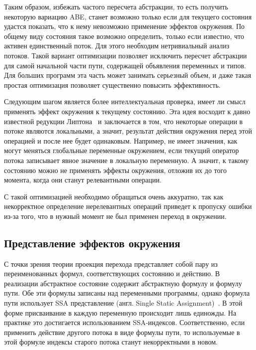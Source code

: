 Таким образом, избежать частого пересчета абстракции, то есть получить некоторую вариацию ABE, станет возможно только если для текущего состояния удастся показать, что к нему невозможно применение эффектов окружения.
По общему виду состояния такое возможно определить, только если известно, что активен единственный поток.
Для этого необходим нетривиальный анализ потоков.
Такой вариант оптимизации позволяет исключить пересчет абстракции для самой начальной части пути, содержащей объявления переменных и типов.
Для больших программ эта часть может занимать серьезный объем, и даже такая простая оптимизация позволяет существенно повысить эффективность.

Следующим шагом является более интеллектуальная проверка, имеет ли смысл применять эффект окружения к текущему состоянию.
Эта идея восходит к давно известной редукции Липтона~\cite{Lipton} и заключается в том, что некоторые операции в потоке являются локальными, а значит, результат действия окружения перед этой операцией и после нее будет одинаковым.
Например, не имеет значения, как могут меняться глобальные переменные окружением, если текущий оператор потока записывает явное значение в локальную переменную.
А значит, к такому состоянию можно не применять эффекты окружения, отложив их до того момента, когда они станут релевантными операции.

С такой оптимизацией необходимо обращаться очень аккуратно, так как некорректное определение нерелевантных операций приведет к пропуску ошибки из-за того, что в нужный момент не был применен переход в окружении.

\subsection{Представление эффектов окружения}
\label{sect_predicate_opt}
С точки зрения теории проекция перехода представляет собой пару из переименованных формул, соответствующих состоянию и действию. 
В реализации абстрактное состояние содержит абстрактную формулу и формулу пути.
Обе эти формулы записаны над переменными программы, однако формула пути использует SSA представление (англ. Single Static Assignment)~\cite{SSA}.
В этой форме присваивание в каждую переменную происходит лишь единожды.
На практике это достигается использованием SSA-индексов.
Соответственно, если применить действие другого потока в виде формулы пути, то используемые в этой формуле индексы старого потока станут некорректными в новом.

